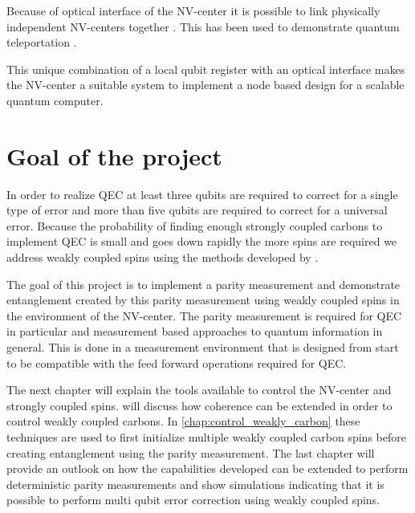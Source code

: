 Because of optical interface of the NV-center it is possible to link physically independent NV-centers together \citep{Bernien2013Heralded}. This has been used to demonstrate quantum teleportation \citep{Pfaff2014Unconditional}.

This unique combination of a local qubit register with an optical interface makes the NV-center a suitable system to implement a node based design for a scalable quantum computer\citep{Nickerson2013Topological}.

\section{Goal of the project}
In order to realize QEC at least three qubits are required to correct for a single type of error and more than five qubits are required to correct for a universal error.
Because the probability of finding enough strongly coupled carbons to implement QEC is small and goes down rapidly the more spins are required \citep{Waldherr2014Quantum,Taminiau2014Universal} we address weakly coupled spins using the methods developed by \citet{Taminiau2014Universal}.

The goal of this project is to implement  a parity measurement and demonstrate entanglement created by this parity measurement using weakly coupled spins in the environment of the NV-center.
The parity measurement is required for QEC in particular and measurement based approaches to quantum information in general.
This is done in a measurement environment that is designed from start to be compatible with the feed forward operations required for QEC.

The next chapter will explain the tools available to control the NV-center and strongly coupled spins.
 will discuss how coherence can be extended
in order to control weakly coupled carbons.
In \cref{chap:control_weakly_carbon} these techniques are used to first initialize multiple weakly coupled carbon spins before creating entanglement using the parity measurement.
The last chapter will provide an outlook on how the capabilities developed can be extended to perform deterministic parity measurements and show simulations indicating that it is possible to perform multi qubit error correction using weakly coupled spins.
